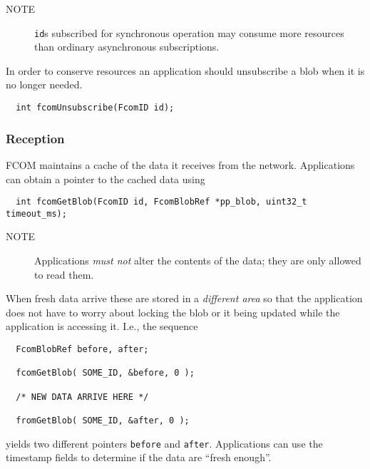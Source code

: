\documentclass[11pt]{article}
\newcommand{\fcom}{FCOM}
\newcommand{\blob}{blob}
\newcommand{\cstl}[1]{{\lstinline+#1+}}
\newcommand{\note}[1]{
	\begin{description}
		\item[NOTE] #1
	\end{description}
}
\begin{document}
      \note{\cstl{id}s subscribed for synchronous operation
      may consume more resources than ordinary asynchronous
      subscriptions.}

      In order to conserve resources an application should
      unsubscribe a \blob{} when it is no longer needed.

      \begin{verbatim}
  int fcomUnsubscribe(FcomID id);
      \end{verbatim}
    \subsubsection{Reception}
      \fcom{} maintains a cache of the data it receives from
      the network. Applications can obtain a pointer to the
      cached data using
      \begin{verbatim}
  int fcomGetBlob(FcomID id, FcomBlobRef *pp_blob, uint32_t timeout_ms);
      \end{verbatim}
      \note{Applications {\em must not} alter the
      contents of the data; they are only allowed to read
      them.}

      When fresh data arrive these are stored in a {\em different
      area} so that the application does not have to worry
      about locking the \blob{} or it being updated while
      the application is accessing it. I.e., the sequence
      \begin{verbatim}
  FcomBlobRef before, after;

  fcomGetBlob( SOME_ID, &before, 0 );

  /* NEW DATA ARRIVE HERE */

  fromGetBlob( SOME_ID, &after, 0 );
      \end{verbatim}
      yields two different pointers {\tt before} and
      {\tt after}. Applications can use the timestamp fields
      to determine if the data are ``fresh enough''.
\end{document}
